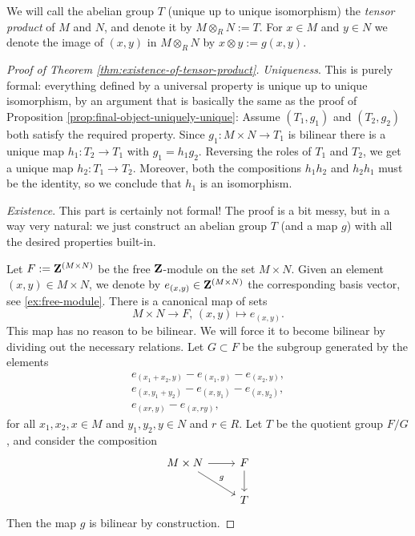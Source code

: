 \begin{definition}We will call the abelian group $T$ (unique up to unique isomorphism) the \emph{tensor product} of $M$ and $N$, and denote it by $M\otimes_R N := T $. For $x\in M$ and $y\in N$ we denote the image of $(x,y)$ in $M\otimes_R N$ by $x\otimes y := g(x,y)$. 
\end{definition}


\begin{proof}[Proof of Theorem \ref{thm:existence-of-tensor-product}]
\emph{Uniqueness}. This is purely formal:  everything defined by a universal property is unique up to unique isomorphism, by an argument  that is basically the same as the proof of Proposition \ref{prop:final-object-uniquely-unique}: 
Assume $(T_1,g_1)$ and $(T_2,g_2)$ both satisfy the required property. Since $g_1\colon M\times N \to T_1$ is bilinear there is a unique map $h_1\colon T_2 \to T_1$ with $g_1=h_1g_2$. Reversing the roles of $T_1$ and $T_2$, we get a unique map $h_2\colon T_1\to T_2$. Moreover, both the compositions $h_1h_2$ and $h_2h_1$ must be the identity, so we conclude that $h_1$ is an isomorphism.

\emph{Existence}. This part is certainly not formal! The proof is a bit messy, but in a way very natural: we just construct an abelian group $T$ (and a map $g$) with all the desired properties built-in. 

Let $F:={\mathbf{Z}}^{(M\times N)}$ be the free ${\mathbf{Z}}$-module on the set $M\times N$. Given an element $(x,y) \in M\times N$, we denote by $e_{(x,y)} \in {\mathbf{Z}}^{(M\times N)}$ the corresponding basis vector, see \ref{ex:free-module}. There is a canonical map of sets
\[
	M\times N \to F,\, (x,y) \mapsto e_{(x,y)}.
\]
This map has no reason to be bilinear. We will force it to become bilinear by dividing out the necessary relations. Let $G\subset F$ be the subgroup generated by the elements
\begin{gather*}
	e_{(x_1+x_2,y)}-e_{(x_1,y)}-e_{(x_2,y)},\\
	e_{(x,y_1+y_2)}-e_{(x,y_1)}-e_{(x,y_2)},\\
	e_{(xr,y)}-e_{(x,ry)},
\end{gather*}
for all $x_1,x_2,x\in M$ and $y_1,y_2,y\in N$ and $r\in R$. Let $T$ be the quotient group $F/G$, and consider the composition
\[
\begin{tikzcd}
M\times N \arrow{r} \arrow{rd}{g} & F \arrow{d} \\
& T
\end{tikzcd}
\]
Then the map $g$ is bilinear by construction.


\end{proof}
